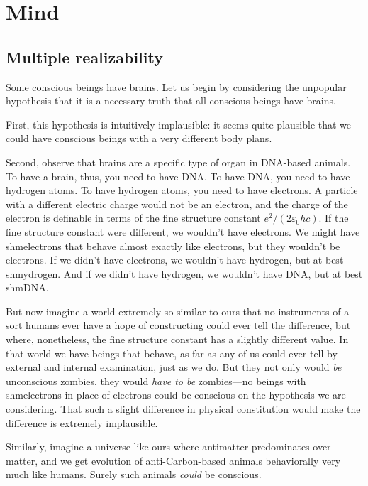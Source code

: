 \def\mychapter{VI}

\chapter{Mind}\label{ch:mind}
\section{Multiple realizability}
Some conscious beings have brains. Let us begin by considering the unpopular hypothesis that it is a necessary 
truth that all conscious beings have brains. 

First, this hypothesis is intuitively implausible: it seems quite plausible that we could have
conscious beings with a very different body plans. 

Second, observe that brains are a specific type of organ in DNA-based animals.
To have a brain, thus, you need to have DNA. To have DNA, you need to have hydrogen
atoms. To have hydrogen atoms, you need to have electrons. A particle with a different 
electric charge would not be an electron, and the charge of the electron is definable in terms of 
the fine structure constant $e^2/(2\varepsilon_0 hc)$. If the fine structure constant
were different, we wouldn't have electrons. We might have shmelectrons that behave almost 
exactly like electrons, but they wouldn't be electrons. If we didn't have electrons, we wouldn't
have hydrogen, but at best shmydrogen. And if we didn't have hydrogen, we wouldn't have DNA,
but at best shmDNA. 

But now imagine a world extremely so similar to ours that no instruments of a sort
humans ever have a hope of constructing could ever tell the difference, but where, nonetheless,
the fine structure constant has a slightly different value. In that world we have beings that
behave, as far as any of us could ever tell by external and internal examination, just as we 
do. But they not only would \textit{be} unconscious zombies, they would \textit{have to be}
zombies---no beings with shmelectrons in place of electrons could be conscious on the hypothesis 
we are considering. That such a slight difference in physical constitution would make the
difference is extremely implausible. 

Similarly, imagine a universe like ours where antimatter predominates over matter, and we get 
evolution of anti-Carbon-based animals behaviorally very much like humans. Surely such animals 
\textit{could} be conscious.

